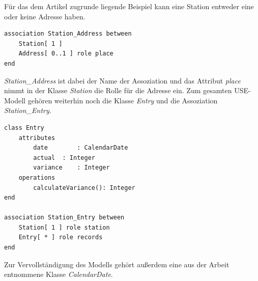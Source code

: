 \documentclass[a4paper,twoside]{article}
\begin{document}
Für das dem Artikel zugrunde liegende Beispiel kann eine Station entweder eine oder keine Adresse haben.

\begin{lstlisting}[caption={USE-Spezifikation der Assoziation zwischen einer Station und einer Adresse},label=lst:assocs1]
association Station_Address between
	Station[ 1 ] 
	Address[ 0..1 ] role place
end
\end{lstlisting}

\textit{Station\_Address} ist dabei der Name der Assoziation und das Attribut \textit{place} nimmt in der Klasse \textit{Station} die Rolle für die Adresse ein. Zum gesamten USE-Modell gehören weiterhin noch die Klasse \textit{Entry} und die Assoziation \textit{Station\_Entry}.

\begin{lstlisting}[caption={USE-Spezifikation der Klasse Entry und der Assoziation zwischen einer Station und deren Entries},label=lst:assocs2]
class Entry
	attributes
		date		: CalendarDate
		actual	: Integer
		variance	: Integer
	operations
		calculateVariance(): Integer 
end

association Station_Entry between
	Station[ 1 ] role station
	Entry[ * ] role records
end
\end{lstlisting}

Zur Vervollständigung des Modells gehört außerdem eine aus der Arbeit \cite{SilvaMasterThesis} entnommene Klasse \textit{CalendarDate}.
\end{document}
